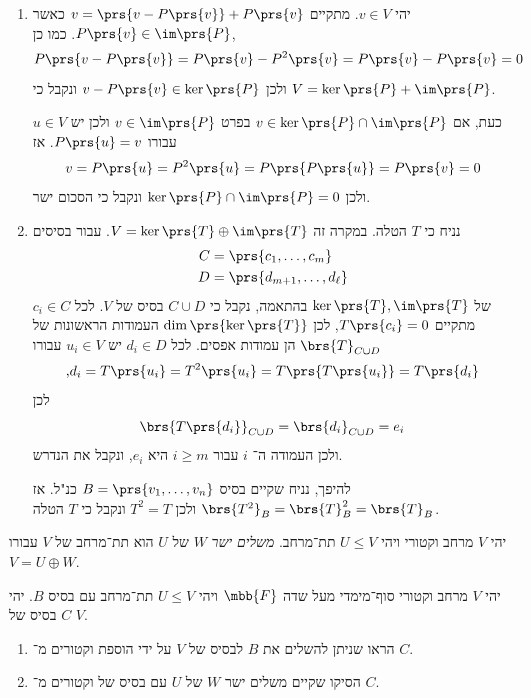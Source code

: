 \documentclass[a4paper,10pt,twoside,openany]{book}
\begin{document}
\begin{solution}
\begin{enumerate}
\item יהי
$v \in V$.
מתקיים
$v = \prs{v - P\prs{v}} + P\prs{v}$
כאשר
$P\prs{v} \in \im\prs{P}$.
כמו כן,
\[P\prs{v - P\prs{v}} = P\prs{v} - P^2\prs{v} = P\prs{v} - P\prs{v} = 0\]
ולכן
$v- P\prs{v} \in \ker\prs{P}$
ונקבל כי
$V = \ker\prs{P} + \im\prs{P}$.

כעת, אם
$v \in \ker\prs{P} \cap \im\prs{P}$
בפרט
$v \in \im\prs{P}$
ולכן יש
$u \in V$
עבורו
$P\prs{u} = v$.
אז
\[v = P\prs{u} = P^2\prs{u} = P\prs{P\prs{u}} = P\prs{v} = 0\]
ולכן
$\ker\prs{P} \cap \im\prs{P} = 0$
ונקבל כי הסכום ישר.

\item
נניח כי
$T$
הטלה. במקרה זה
$V = \ker\prs{T} \oplus \im\prs{T}$.
עבור בסיסים
\begin{align*}
C &= \prs{c_1, \ldots, c_m} \\
D &= \prs{d_{m+1}, \ldots, d_\ell}
\end{align*}
של
$\ker\prs{T}, \im\prs{T}$
בהתאמה, נקבל כי
$C \cup D$
בסיס של
$V$.
לכל
$c_i \in C $
מתקיים
$T\prs{c_i} = 0$,
לכן
$\dim\prs{\ker\prs{T}}$
העמודות הראשונות של
$\brs{T}_{C \cup D}$
הן עמודות אפסים.
לכל
$d_i \in D$
יש
$u_i \in V$
עבורו
\[\text{,} d_i = T\prs{u_i} = T^2\prs{u_i} = T\prs{T\prs{u_i}} = T\prs{d_i}\]
לכן
\[\brs{T\prs{d_i}}_{C \cup D} = \brs{d_i}_{C \cup D} = e_i\]
ולכן העמודה ה־%
$i$
עבור
$i \geq m$
היא
$e_i$,
ונקבל את הנדרש.

להיפך, נניח שקיים בסיס
$B = \prs{v_1, \ldots, v_n}$
כנ"ל. אז
$\brs{T^2}_B = \brs{T}_B^2 = \brs{T}_B$
ולכן
$T^2 = T$
ונקבל כי
$T$
הטלה.
\end{enumerate}
\end{solution}

\begin{definition}
יהי
$V$
מרחב וקטורי ויהי
$U \leq V$
תת־מרחב.
\emph{משלים ישר}
$W$
של
$U$
הוא תת־מרחב של
$V$
עבורו
$V = U \oplus W$.
\end{definition}

\begin{exercise}
יהי
$V$
מרחב וקטורי סוף־מימדי מעל שדה
$\mbb{F}$
ויהי
$U \leq V$
תת־מרחב עם בסיס
$B$.
יהי
$C$
בסיס של
$V$.
\begin{enumerate}
\item הראו שניתן להשלים את
$B$
לבסיס של
$V$
על ידי הוספת וקטורים מ־%
$C$.

\item הסיקו שקיים משלים ישר
$W$
של
$U$
עם בסיס של וקטורים מ־%
$C$.
\end{enumerate}
\end{exercise}
\end{document}
